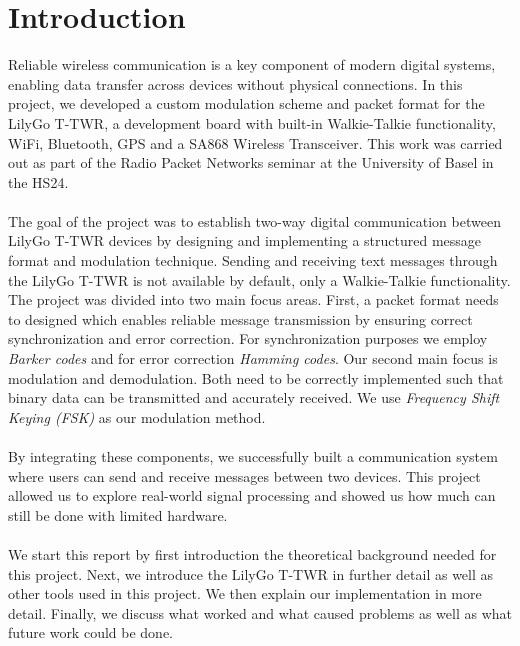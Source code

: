 \chapter{Introduction}
Reliable wireless communication is a key component of modern digital systems, enabling data transfer across devices without physical connections. In this project, we developed a custom modulation scheme and packet format for the LilyGo T-TWR, a development board with built-in Walkie-Talkie functionality, WiFi, Bluetooth, GPS and a SA868 Wireless Transceiver. This work was carried out as part of the Radio Packet Networks seminar at the University of Basel in the HS24.
\\\\
The goal of the project was to establish two-way digital communication between LilyGo T-TWR devices by designing and implementing a structured message format and modulation technique. Sending and receiving text messages through the LilyGo T-TWR is not available by default, only a Walkie-Talkie functionality. The project was divided into two main focus areas. First, a packet format needs to designed which enables reliable message transmission by ensuring correct synchronization and error correction. For synchronization purposes we employ \textit{Barker codes} and for error correction \textit{Hamming codes}. Our second main focus is modulation and demodulation. Both need to be correctly implemented such that binary data can be transmitted and accurately received. We use \textit{Frequency Shift Keying (FSK)} as our modulation method.
\\ \\
By integrating these components, we successfully built a communication system where users can send and receive messages between two devices. This project allowed us to explore real-world signal processing and showed us how much can still be done with limited hardware.
\\ \\
We start this report by first introduction the theoretical background needed for this project. Next, we introduce the LilyGo T-TWR in further detail as well as other tools used in this project. We then explain our implementation in more detail. Finally, we discuss what worked and what caused problems as well as what future work could be done.